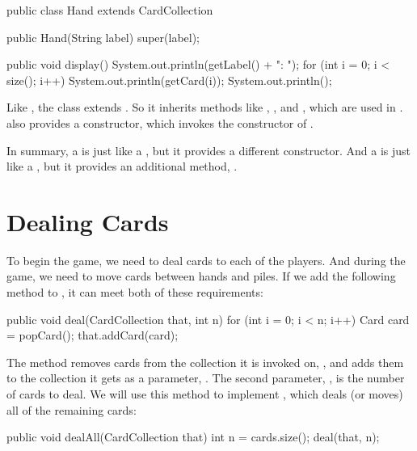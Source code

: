 
\begin{code}
public class Hand extends CardCollection {

    public Hand(String label) {
        super(label);
    }

    public void display() {
        System.out.println(getLabel() + ": ");
        for (int i = 0; i < size(); i++) {
            System.out.println(getCard(i));
        }
        System.out.println();
    }
}
\end{code}

Like , the  class extends .
So it inherits methods like , , and , which are used in .
 also provides a constructor, which invokes the constructor of .

In summary, a  is just like a , but it provides a different constructor.
And a  is just like a , but it provides an additional method, .



\section{Dealing Cards}
\label{extending-classes_dealing-cards}
\label{dealing}

To begin the game, we need to deal cards to each of the players.
And during the game, we need to move cards between hands and piles.
If we add the following method to , it can meet both of these requirements:

\begin{code}
public void deal(CardCollection that, int n) {
    for (int i = 0; i < n; i++) {
        Card card = popCard();
        that.addCard(card);
    }
}
\end{code}

The  method removes cards from the collection it is invoked on, , and adds them to the collection it gets as a parameter, .
The second parameter, , is the number of cards to deal.
We will use this method to implement , which deals (or moves) all of the remaining cards:

\begin{code}
public void dealAll(CardCollection that) {
    int n = cards.size();
    deal(that, n);
}
\end{code}

